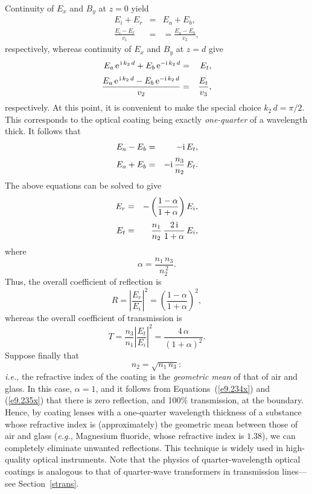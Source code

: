 Continuity of $E_x$  and $B_y$ at $z=0$ yield
\begin{eqnarray}
E_i+E_r &=& E_a+E_b,\\[0.5ex]
\frac{E_i-E_r}{v_1} &=& = \frac{E_a-E_b}{v_2},
\end{eqnarray}
respectively, whereas continuity of $E_x$ and $B_y$ at $z=d$ give
\begin{eqnarray}
E_a\,{\rm e}^{\,{\rm i}\,k_2\,d}+ E_b\,{\rm e}^{-{\rm i}\,k_2\,d} &=& E_t,\\[0.5ex]
\frac{E_a\,{\rm e}^{\,{\rm i}\,k_2\,d}- E_b\,{\rm e}^{-{\rm i}\,k_2\,d}}{v_2} &=& \frac{E_t}{v_3},
\end{eqnarray}
respectively. At this point, it is convenient to make the special choice
$k_2\,d=\pi/2$. This corresponds to the optical coating being exactly {\em one-quarter}\/ of a wavelength thick. It follows that
\begin{eqnarray}
E_a - E_b &=& - {\rm i}\,E_t,\\[0.5ex]
E_a + E_b &=& -{\rm i}\,\frac{n_3}{n_2}\,E_t.
\end{eqnarray}
The above equations can be solved to give
\begin{eqnarray}
E_r &=& -\left(\frac{1-\alpha}{1+\alpha}\right) E_i,\\[0.5ex]
E_t &=&  \frac{n_1}{n_2}\,\frac{2\,{\rm i}}{1+\alpha}\,E_i,
\end{eqnarray}
where
\begin{equation}
\alpha = \frac{n_1\,n_3}{n_2^{\,2}}.
\end{equation}
Thus, the overall coefficient of reflection is 
\begin{equation}\label{e9.234x}
R = \left|\frac{E_r}{E_i}\right|^2 = \left(\frac{1-\alpha}{1+\alpha}\right)^2,
\end{equation}
whereas the overall coefficient of transmission is
\begin{equation}\label{e9.235x}
T = \frac{n_3}{n_1} \left|\frac{E_t}{E_i}\right|^2  = \frac{4\,\alpha}{(1+\alpha)^2}.
\end{equation}
Suppose finally that
\begin{equation}
n_2 = \sqrt{n_1\,n_3}:
\end{equation}
{\em i.e.}, the refractive index of the coating is the {\em geometric mean}\/
of that of air and glass. In this case, $\alpha=1$, and it follows from
Equations~(\ref{e9.234x}) and (\ref{e9.235x}) that there is zero
reflection, and 100\% transmission, at the boundary. Hence, by
coating lenses with a one-quarter wavelength thickness of a substance
whose refractive index is (approximately) the geometric mean between those of air and glass ({\em e.g.}, Magnesium fluoride, whose refractive index is  $1.38$), we can
completely eliminate unwanted reflections. This technique is
widely used in high-quality optical instruments. Note that
the physics of quarter-wavelength optical coatings is analogous to
that of quarter-wave transformers in transmission lines---see Section~\ref{strans}.

